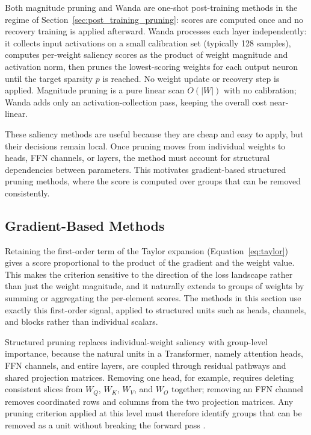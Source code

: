 Both magnitude pruning and Wanda are one-shot post-training methods in the regime of Section~\ref{sec:post_training_pruning}: scores are computed once and no recovery training is applied afterward. Wanda processes each layer independently: it collects input activations on a small calibration set (typically 128 samples), computes per-weight saliency scores as the product of weight magnitude and activation norm, then prunes the lowest-scoring weights for each output neuron until the target sparsity $p$ is reached. No weight update or recovery step is applied. Magnitude pruning is a pure linear scan $O(|W|)$ with no calibration; Wanda adds only an activation-collection pass, keeping the overall cost near-linear.

These saliency methods are useful because they are cheap and easy to apply, but their decisions remain local. Once pruning moves from individual weights to heads, FFN channels, or layers, the method must account for structural dependencies between parameters. This motivates gradient-based structured pruning methods, where the score is computed over groups that can be removed consistently.

\subsection{Gradient-Based Methods}

Retaining the first-order term of the Taylor expansion (Equation~\eqref{eq:taylor}) gives a score proportional to the product of the gradient and the weight value. This makes the criterion sensitive to the direction of the loss landscape rather than just the weight magnitude, and it naturally extends to groups of weights by summing or aggregating the per-element scores. The methods in this section use exactly this first-order signal, applied to structured units such as heads, channels, and blocks rather than individual scalars.

Structured pruning replaces individual-weight saliency with group-level importance, because the natural units in a Transformer, namely attention heads, FFN channels, and entire layers, are coupled through residual pathways and shared projection matrices. Removing one head, for example, requires deleting consistent slices from $W_Q$, $W_K$, $W_V$, and $W_O$ together; removing an FFN channel removes coordinated rows and columns from the two projection matrices. Any pruning criterion applied at this level must therefore identify groups that can be removed as a unit without breaking the forward pass \cite{michel2022not,kurtic2022optimal}.


